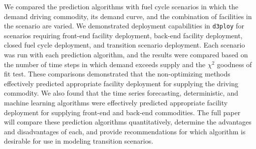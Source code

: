 \documentclass{anstrans}
\begin{document}
We compared the prediction algorithms with
fuel cycle scenarios in which the
demand driving commodity, its demand curve, and the combination of facilities 
in the scenario are varied. 
We demonstrated deployment capabilities in \texttt{d3ploy} for scenarios 
requiring front-end facility deployment, back-end facility deployment, 
closed fuel cycle deployment, and transition scenario deployment.
Each scenario was run with each prediction algorithm, and the results 
were compared based on the number of time
steps in which demand exceeds supply and the $\chi^2$ goodness of fit test.
These comparisons demonstrated that the non-optimizing methods
effectively predicted
appropriate facility deployment for supplying the driving commodity.  
We also found that the time series forecasting, deterministic,
and machine learning 
algorithms were effectively predicted appropriate facility deployment for 
supplying front-end and back-end commodities. The full paper will compare 
these prediction algorithms quantitatively, determine the advantages and 
disadvantages of each, and provide recommendations for which algorithm is 
desirable for use in modeling transition scenarios. 



\end{document}
